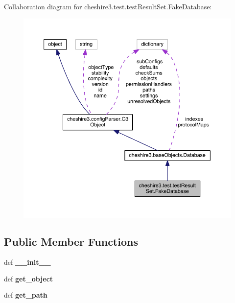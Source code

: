 Collaboration diagram for cheshire3.\-test.\-test\-Result\-Set.\-Fake\-Database\-:
\nopagebreak
\begin{figure}[H]
\begin{center}
\leavevmode
\includegraphics[width=350pt]{classcheshire3_1_1test_1_1test_result_set_1_1_fake_database__coll__graph}
\end{center}
\end{figure}
\subsection*{Public Member Functions}
\begin{DoxyCompactItemize}
\item 
\hypertarget{classcheshire3_1_1test_1_1test_result_set_1_1_fake_database_a1d447008ef54bdd6e603c6ef0490676c}{def {\bfseries \-\_\-\-\_\-init\-\_\-\-\_\-}}\label{classcheshire3_1_1test_1_1test_result_set_1_1_fake_database_a1d447008ef54bdd6e603c6ef0490676c}

\item 
\hypertarget{classcheshire3_1_1test_1_1test_result_set_1_1_fake_database_a839f193424cdde254d072cd7b3bc88ba}{def {\bfseries get\-\_\-object}}\label{classcheshire3_1_1test_1_1test_result_set_1_1_fake_database_a839f193424cdde254d072cd7b3bc88ba}

\item 
\hypertarget{classcheshire3_1_1test_1_1test_result_set_1_1_fake_database_a54e23e60be2b70ed14eb5d0c05a6cade}{def {\bfseries get\-\_\-path}}\label{classcheshire3_1_1test_1_1test_result_set_1_1_fake_database_a54e23e60be2b70ed14eb5d0c05a6cade}

\end{DoxyCompactItemize}
